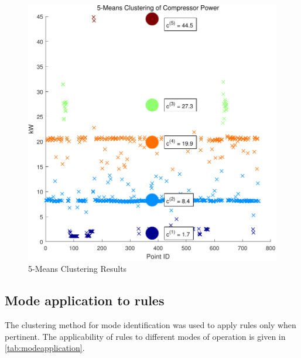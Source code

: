 \begin{figure}
\includegraphics[width = \columnwidth]{./Images/5MeansClustering.pdf}
\caption{5-Means Clustering Results}
\label{fig:5meansclustering}
\end{figure}

\subsection{Mode application to rules}
\label{subsec:modeapplication}
The clustering method for mode identification was used to apply rules only when pertinent. The applicability of rules to different modes of operation is given in \autoref{tab:modeapplication}.

